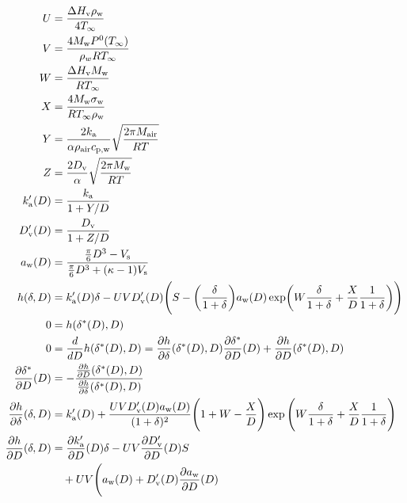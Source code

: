 \documentclass{article}
\begin{document}
\begin{align}
  U &= \frac{\Delta H_{\rm v} \rho_{\rm w}}{4 T_{\infty}} \\
  V &= \frac{4 M_{\rm w} P^{\rm 0}(T_{\infty})}{\rho_w R T_{\infty}} \\
  W &= \frac{\Delta H_{\rm v} M_{\rm w}}{R T_{\infty}} \\
  X &= \frac{4 M_{\rm w}\sigma_{\rm w}}{R T_{\infty} \rho_{\rm w}} \\
  Y &= \frac{2 k_{\rm a}}{\alpha \rho_{\rm air} c_{\rm p,w}} \sqrt{\frac{2 \pi M_{\rm air}}{R T}} \\
  Z &= \frac{2 D_{\rm v}}{\alpha} \sqrt{\frac{2 \pi M_{\rm w}}{R T}} \\
  k_{\rm a}'(D) &= \frac{k_{\rm a}}{1 + Y / D} \\
  D_{\rm v}'(D) &= \frac{D_{\rm v}}{1 + Z / D} \\
  a_{\rm w}(D) &= \frac{\frac{\pi}{6}D^3 - V_{\rm s}}{\frac{\pi}{6}D^3 + (\kappa - 1) V_{\rm s}} \\
  h(\delta, D) &= k_{\rm a}'(D) \delta
  - U V D_{\rm v}'(D) \Biggl(S - \biggl(\frac{\delta}{1+\delta}\biggr)
  a_{\rm w}(D)
  \exp\biggl(W \frac{\delta}{1+\delta} + \frac{X}{D} \frac{1}{1+\delta}\biggr) \Biggr) \\
  0 &= h(\delta^*(D), D) \\
  0 &= \frac{d}{d D} h(\delta^*(D), D)
  = \frac{\partial h}{\partial \delta}(\delta^*(D), D)
  \frac{\partial \delta^*}{\partial D}(D)
  + \frac{\partial h}{\partial D}(\delta^*(D), D) \\
  \frac{\partial \delta^*}{\partial D}(D)
  &= - \frac{\frac{\partial h}{\partial D}(\delta^*(D), D)}{\frac{\partial h}{\partial \delta}(\delta^*(D), D)} \\
  \frac{\partial h}{\partial \delta}(\delta, D) &= k_{\rm a}'(D) +
  \frac{U V D_{\rm v}'(D) a_{\rm w}(D)}{(1 + \delta)^2} \Biggl( 1 + W
  - \frac{X}{D} \Biggr) \exp{\Biggl(W \frac{\delta}{1+\delta} +
      \frac{X}{D} \frac{1}{1+\delta}\Biggr)} \\
  \frac{\partial h}{\partial D}(\delta, D) &=
  \frac{\partial k_{\rm a}'}{\partial D}(D) \delta
  - U V \frac{\partial D_{\rm v}'}{\partial D}(D) S \nonumber \\
  &\quad + U V \Biggl( a_{\rm w}(D) + D_{\rm v}'(D) \frac{\partial a_{\rm w}}{\partial D}(D)

\end{align}
\end{document}
